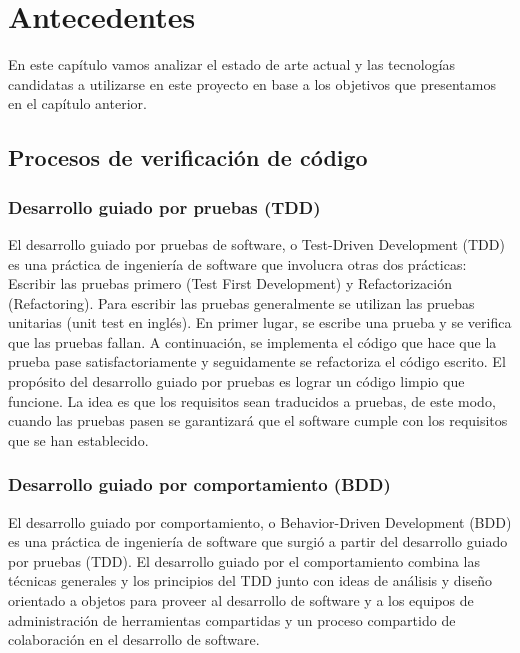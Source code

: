 \chapter{Antecedentes}

En este capítulo vamos analizar el estado de arte actual y las tecnologías candidatas a utilizarse en este proyecto en base a los objetivos que presentamos en el capítulo anterior.

\section {Procesos de verificación de código}


\subsection {Desarrollo guiado por pruebas (TDD)}

El desarrollo guiado por pruebas de software, o Test-Driven Development (TDD) es una práctica de ingeniería de software que involucra otras dos prácticas: Escribir las pruebas primero (Test First Development) y Refactorización (Refactoring). Para escribir las pruebas generalmente se utilizan las pruebas unitarias (unit test en inglés). En primer lugar, se escribe una prueba y se verifica que las pruebas fallan. A continuación, se implementa el código que hace que la prueba pase satisfactoriamente y seguidamente se refactoriza el código escrito. El propósito del desarrollo guiado por pruebas es lograr un código limpio que funcione. La idea es que los requisitos sean traducidos a pruebas, de este modo, cuando las pruebas pasen se garantizará que el software cumple con los requisitos que se han establecido.

\subsection {Desarrollo guiado por comportamiento (BDD)}

El desarrollo guiado por comportamiento, o Behavior-Driven Development (BDD) es una práctica de ingeniería de software que surgió a partir del desarrollo guiado por pruebas (TDD). El desarrollo guiado por el comportamiento combina las técnicas generales y los principios del TDD junto con ideas de análisis y diseño orientado a objetos para proveer al desarrollo de software y a los equipos de administración de herramientas compartidas y un proceso compartido de colaboración en el desarrollo de software.


